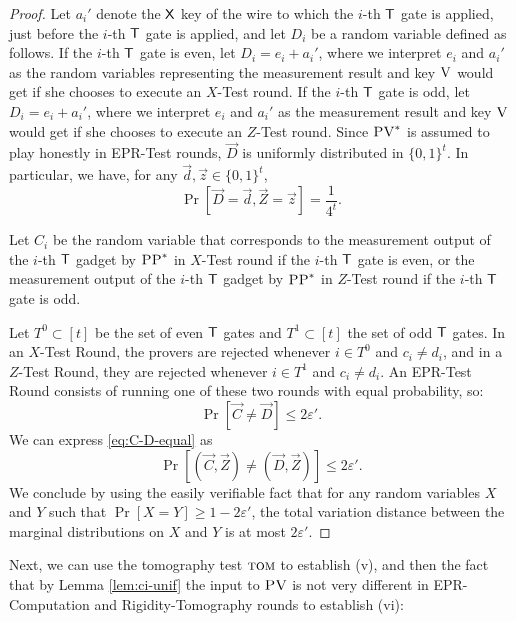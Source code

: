 \documentclass[11pt]{article}
\theoremstyle{remark}
\theoremstyle{definition}
\newcommand{\eps}{\varepsilon}
\newcommand{\tom}{\textsc{tom}}
\newcommand{\ver}{\textsc{V}}
\newcommand{\pv}{\textsc{PV}}
\newcommand{\pp}{\textsc{PP}}
\begin{document}
\begin{proof}
Let $a_i'$ denote the $\sf X$ key of the wire to which the $i$-th $\sf T$ gate is applied, just before the $i$-th $\sf T$ gate is applied, and let $D_i$ be a random variable defined as follows. If the $i$-th $\sf T$ gate is even, let $D_i=e_i+a_i'$, where we interpret $e_i$ and $a_i'$ as the random variables representing the measurement result and key $\ver$ would get if she chooses to execute an $X$-Test round. If the $i$-th $\sf T$ gate is odd, let $D_i=e_i+a_i'$, where we interpret $e_i$ and $a_i'$ as the measurement result and key $\ver$ would get if she chooses to execute an $Z$-Test round. Since $\pv^*$ is assumed to play honestly in EPR-Test rounds, $\vec{D}$ is uniformly distributed in $\{0,1\}^t$. In particular, we have, for any $\vec{d},\vec{z}\in\{0,1\}^t$,
\begin{equation}
\Pr[\vec{D}=\vec{d},\vec{Z}=\vec{z}]=\frac{1}{4^t}.\label{eq:D-unif}
\end{equation}

Let $C_i$ be the random variable that corresponds to the measurement output of
  the $i$-th $\sf T$ gadget by $\pp^*$ in $X$-Test round if the $i$-th $\sf T$
  gate is even, or the measurement output of the $i$-th $\sf T$ gadget 
  by $\pp^*$ in $Z$-Test round if the $i$-th $\sf T$ gate is odd.

Let $T^0\subset[t]$ be the set of even $\sf T$ gates and $T^1\subset[t]$ the set of odd $\sf T$ gates. In an $X$-Test Round, the provers are rejected whenever $i\in T^0$ and $c_i\neq d_i$, and in a $Z$-Test Round, they are rejected whenever $i\in T^1$ and $c_i\neq d_i$. An EPR-Test Round consists of running one of these two rounds with equal probability, so:
\begin{equation}
\Pr[\vec{C}\neq\vec{D}]  \leq  2\eps'.\label{eq:C-D-equal}
\end{equation}
We can express \eqref{eq:C-D-equal} as
\begin{equation*}
\Pr[(\vec{C},\vec{Z})\neq(\vec{D},\vec{Z})]  \leq  2\eps'.
\end{equation*}
We conclude by using the easily verifiable fact that for any random variables $X$ and $Y$ such that $\Pr[X= Y]\geq 1-2\eps'$, the total variation distance between the marginal distributions on $X$ and $Y$ is at most $2\eps'$. 
\end{proof}

Next, we can use the tomography test $\tom$ to establish (v), and then the fact that by Lemma \ref{lem:ci-unif} the input to $\pv$ is not very different in EPR-Computation and Rigidity-Tomography rounds to establish (vi):
\end{document}
